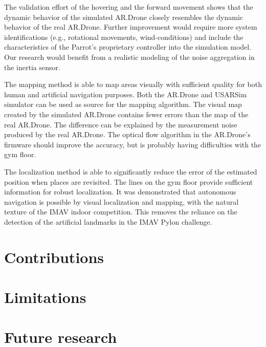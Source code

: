 The validation effort of the hovering and the forward movement shows that the dynamic behavior of the simulated AR.Drone closely resembles the dynamic behavior of the real AR.Drone.
Further improvement would require more system identifications (e.g., rotational movements, wind-conditions) and include the characteristics of the Parrot's proprietary controller into the simulation model. 
Our research would benefit from a realistic modeling of the noise aggregation
in the inertia sensor.

The mapping method is able to map areas visually with sufficient quality for both human and artificial navigation purposes.
Both the AR.Drone and USARSim simulator can be used as source for the mapping algorithm.
The visual map created by the simulated AR.Drone contains fewer errors than the map of the real AR.Drone.
The difference can be explained by the measurement noise produced by the real AR.Drone.
The optical flow algorithm in the AR.Drone's firmware should improve the accuracy, but is probably having difficulties with the gym floor.

The localization method is able to significantly reduce the error of the estimated position when places are revisited.
The lines on the gym floor provide sufficient information for robust localization. It was demonstrated that autonomous navigation is possible by visual localization and mapping, with the natural texture of the IMAV indoor competition. This removes the reliance on the detection of the artificial landmarks in the IMAV Pylon challenge.
	\section{Contributions}
	\section{Limitations}
	\section{Future research}
